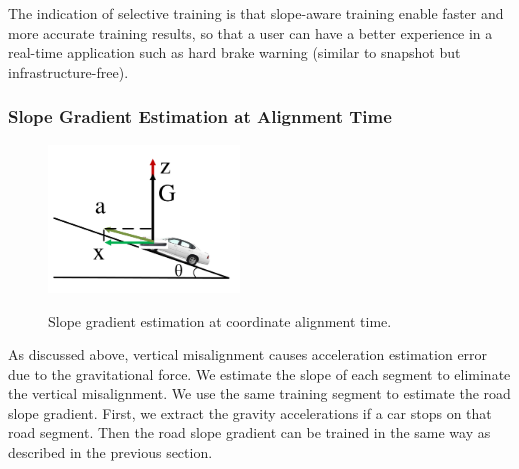 The indication of selective training is that slope-aware training enable 
faster and more accurate training results, so that a user
can have a better experience in a real-time application such as hard brake warning
(similar to snapshot \cite{snapshot} but infrastructure-free).


\subsubsection{Slope Gradient Estimation at Alignment Time}


\begin{figure}[!tbph]
\begin{center}
\includegraphics[width=2.0in, angle=0]{Figs/SlopeAware/slopeandcarphone.pdf}
\vspace{-0.0cm}
\caption{Slope gradient estimation at coordinate alignment time.}
\vspace{-0.3cm}
\label{slopecarphone}
\end{center}
\end{figure}

As discussed above, vertical misalignment causes acceleration estimation error due to the gravitational force. 
We estimate the slope of each segment to eliminate the vertical misalignment.
We use the same training segment to estimate the road slope gradient. 
First, we extract the gravity accelerations if a car stops on that road segment.
Then the road slope gradient can be trained in the same way as described in the previous section.



